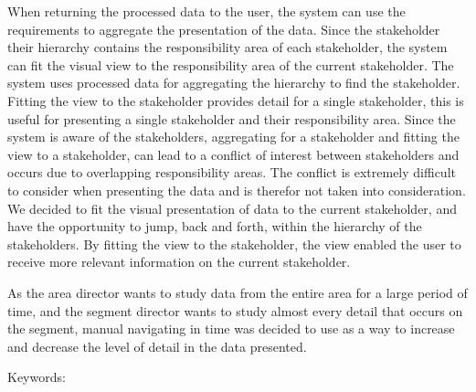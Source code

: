 When returning the processed data to the user, the system can use the 
requirements to aggregate the presentation of the data. Since the stakeholder 
their hierarchy contains the responsibility area of each stakeholder, the 
system can fit the visual view to the responsibility area of the current 
stakeholder. The system uses processed data for aggregating the hierarchy to 
find the stakeholder. Fitting the view to the stakeholder provides detail for 
a single stakeholder, this is useful for presenting a single stakeholder and 
their responsibility area. Since the system is aware of the stakeholders,
aggregating for a stakeholder and fitting the view to a stakeholder, can lead
to a conflict of interest between stakeholders and occurs due to overlapping 
responsibility areas. The conflict is extremely difficult to consider when
presenting the data and is therefor not taken into consideration. We decided 
to fit the visual presentation of data to the current stakeholder, and have 
the opportunity to jump, back and forth, within the hierarchy of the
stakeholders. By fitting the view to the stakeholder, the view enabled the 
user to receive more relevant information on the current stakeholder.

As the area director wants to study data from the entire area for a large 
period of time, and the segment director wants to study almost every detail 
that occurs on the segment, manual navigating in time was decided to use as a 
way to increase and decrease the level of detail in the data presented.


Keywords:

